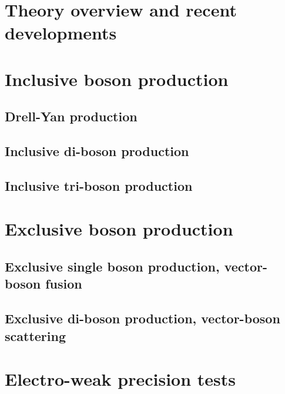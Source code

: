 \documentclass[12pt]{iopart}
\begin{document}
\section{Theory overview and recent developments}
\label{s-theory-overview}


\section{Inclusive boson production}
\label{s-inclboson}

\subsection{Drell-Yan production}
\label{ss-inclboson-drellyan}


\subsection{Inclusive di-boson production}










\subsection{Inclusive tri-boson production}


\section{Exclusive boson production}
\label{s-exclboson}
\subsection{Exclusive single boson production, vector-boson fusion}


\subsection{Exclusive di-boson production, vector-boson scattering}


\section{Electro-weak precision tests}
\end{document}
